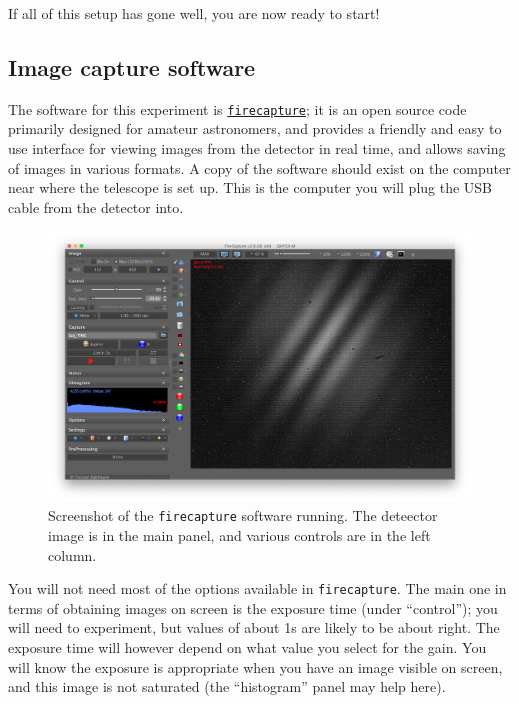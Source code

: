 \documentclass[11pt]{article}
\begin{document}
If all of this setup has gone well, you are now ready to start!

\subsection{Image capture software}\label{sec:software}

The software for this experiment is \href{http://www.firecapture.de/}{\texttt{firecapture}}; it is an open source code primarily designed for amateur astronomers, and provides a friendly and easy to use interface for viewing images from the detector in real time, and allows saving of images in various formats. A copy of the software should exist on the computer near where the telescope is set up. This is the computer you will plug the USB cable from the detector into.

\begin{figure}[h]
    \centering
    \includegraphics[width=1\textwidth]{doc/fc.png}
    \caption{Screenshot of the \texttt{firecapture} software running. The deteector image is in the main panel, and various controls are in the left column.}
    \label{fig:fc}
\end{figure}

You will not need most of the options available in \texttt{firecapture}. The main one in terms of obtaining images on screen is the exposure time (under ``control''); you will need to experiment, but values of about 1s are likely to be about right. The exposure time will however depend on what value you select for the gain. You will know the exposure is appropriate when you have an image visible on screen, and this image is not saturated (the ``histogram'' panel may help here).
\end{document}
